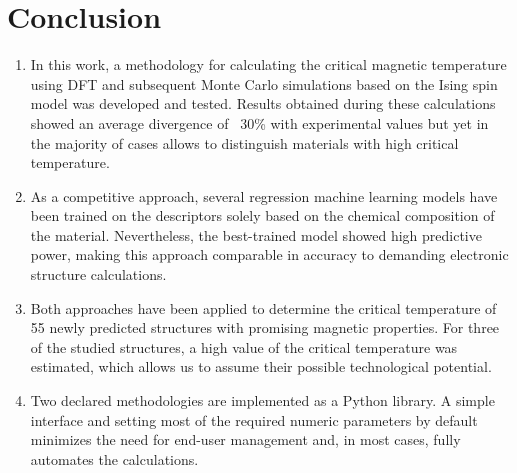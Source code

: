 \section{Conclusion}
\begin{enumerate}
\item In this work, a methodology for calculating the critical magnetic temperature using DFT and subsequent Monte Carlo simulations based on the Ising spin model was developed and tested. Results obtained during these calculations showed an average divergence of ~30\% with experimental values but yet in the majority of cases allows to distinguish materials with high critical temperature.

\item As a competitive approach, several regression machine learning models have been trained on the descriptors solely based on the chemical composition of the material. Nevertheless, the best-trained model showed high predictive power, making this approach comparable in accuracy to demanding electronic structure calculations.

\item Both approaches have been applied to determine the critical temperature of 55 newly predicted structures with promising magnetic properties. For three of the studied structures, a high value of the critical temperature was estimated, which allows us to assume their possible technological potential.

\item Two declared methodologies are implemented as a Python library. A simple interface and setting most of the required numeric parameters by default minimizes the need for end-user management and, in most cases, fully automates the calculations.

\end{enumerate}







